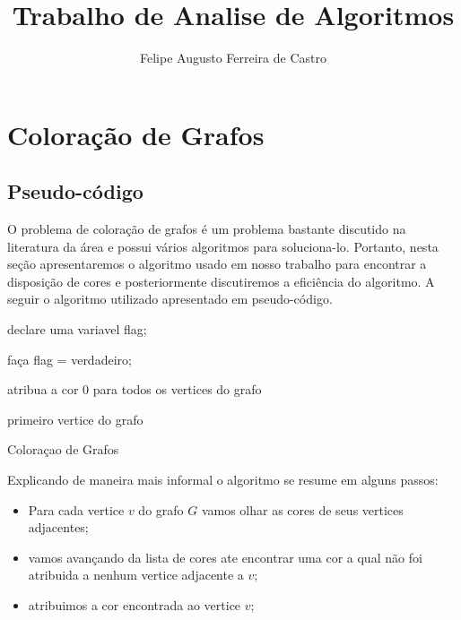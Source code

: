 \documentclass[12pt,openright,oneside,a4paper,brazil]{abntex2}
\title{Trabalho de Analise de Algoritmos}
\author{Felipe Augusto Ferreira de Castro}
\begin{document}
\maketitle

\chapter{Coloração de Grafos}

\section{Pseudo-código}

O problema de coloração de grafos é um problema bastante discutido na literatura da área e possui vários algoritmos para soluciona-lo. Portanto, nesta seção apresentaremos o algoritmo usado em nosso trabalho para encontrar a disposição de cores e posteriormente discutiremos a eficiência do algoritmo. A seguir o algoritmo utilizado apresentado em pseudo-código.\linebreak

\begin{algorithm}[H]
\SetAlgoLined
{}
declare uma variavel flag;

faça flag = verdadeiro;

atribua a cor 0 para todos os vertices do grafo\;

primeiro vertice do grafo\; 

\caption{Coloraçao de Grafos}
\end{algorithm}

Explicando de maneira mais informal o algoritmo se resume em alguns passos:
\begin{itemize}
	\item Para cada vertice $v$ do grafo $G$ vamos olhar as cores de seus vertices adjacentes;
	\item vamos avançando da lista de cores ate encontrar uma cor a qual não foi atribuida a nenhum vertice adjacente a $v$;
	\item atribuimos a cor encontrada ao vertice $v$; 
\end{itemize}
\end{document}

